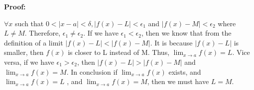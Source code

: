 \documentclass[a4paper,12pt]{report}
\begin{document}
\noindent
\textbf{Proof: }

\noindent
$\forall x $ such that $0<|x-a|<\delta, |f(x)-L|< \epsilon_1$ and $|f(x)-M|< \epsilon_2$ where $L\neq M$. Therefore, $\epsilon_1 \neq \epsilon_2$. If we have $\epsilon_1<\epsilon_2$, then we know that from the definition of a limit $|f(x)-L|<|f(x)-M|$. It is because $|f(x)-L|$ is smaller, then $f(x)$ is closer to L instead of M. Thus, $\displaystyle{\lim_{x\to a}}f(x)=L$. Vice versa, if we have $\epsilon_1 > \epsilon_2$, then $|f(x)-L|>|f(x)-M|$ and $\displaystyle{\lim_{x\to a}}f(x)=M$. In conclusion if  $\displaystyle{\lim_{x\to a}}f(x)$ exists, and 
$\displaystyle{\lim_{x\to a}}f(x)=L$ , and
$\displaystyle{\lim_{x\to a}}f(x)=M$, then we
must have $L=M$.
\end{document}
